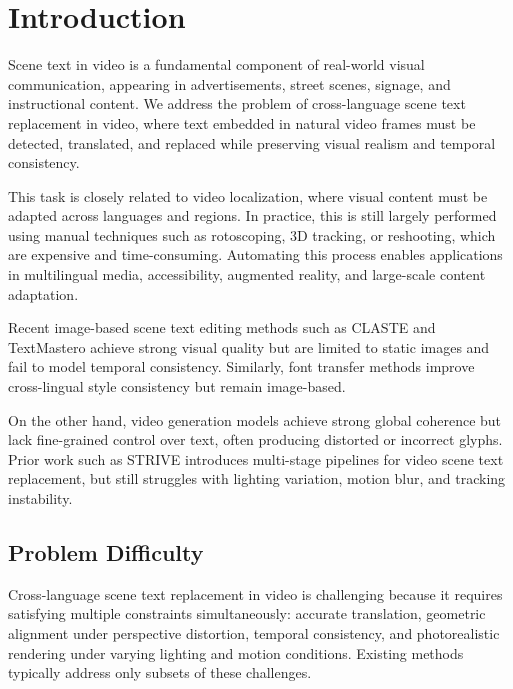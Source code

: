 \maketitle

\section{Introduction}
\label{sec:intro}

Scene text in video is a fundamental component of real-world visual communication, appearing in advertisements, street scenes, signage, and instructional content. We address the problem of cross-language scene text replacement in video, where text embedded in natural video frames must be detected, translated, and replaced while preserving visual realism and temporal consistency.

This task is closely related to video localization, where visual content must be adapted across languages and regions. In practice, this is still largely performed using manual techniques such as rotoscoping, 3D tracking, or reshooting, which are expensive and time-consuming. Automating this process enables applications in multilingual media, accessibility, augmented reality, and large-scale content adaptation.

Recent image-based scene text editing methods such as CLASTE \cite{claste} and TextMastero \cite{textmastero} achieve strong visual quality but are limited to static images and fail to model temporal consistency. Similarly, font transfer methods \cite{fewshotfont, fontify} improve cross-lingual style consistency but remain image-based.

On the other hand, video generation models achieve strong global coherence but lack fine-grained control over text, often producing distorted or incorrect glyphs. Prior work such as STRIVE \cite{strive} introduces multi-stage pipelines for video scene text replacement, but still struggles with lighting variation, motion blur, and tracking instability.

\subsection{Problem Difficulty}

Cross-language scene text replacement in video is challenging because it requires satisfying multiple constraints simultaneously: accurate translation, geometric alignment under perspective distortion, temporal consistency, and photorealistic rendering under varying lighting and motion conditions. Existing methods typically address only subsets of these challenges.

